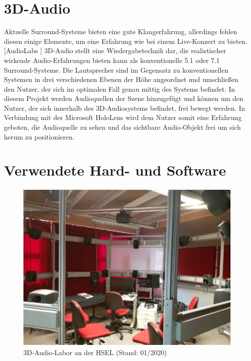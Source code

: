 \documentclass[11pt, titlepage, fleqn]{report}
\begin{document}
        \section{3D-Audio}
            Aktuelle Surround-Systeme bieten eine gute Klangerfahrung, 
            allerdings fehlen diesen einige Elemente, um eine Erfahrung wie bei 
            einem Live-Konzert zu bieten.  [AudioLabs \cite{AudioLabs}]\newline
            3D-Audio stellt eine Wiedergabetechnik dar, die realistischer wirkende Audio-Erfahrungen bieten kann als konventionelle 5.1 oder 7.1 Surround-Systeme.
            Die Lautsprecher sind im Gegensatz zu konventionellen Systemen in 
            drei verschiedenen Ebenen der Höhe angeordnet und umschließen den 
            Nutzer, der sich im optimalen Fall genau mittig des Systems 
            befindet.
            In diesem Projekt werden Audioquellen der Szene hinzugefügt und können um den Nutzer, der sich innerhalb des 3D-Audiosystems befindet, frei bewegt werden. In Verbindung mit der Microsoft 
            HoloLens wird dem Nutzer somit eine Erfahrung geboten, die Audioquelle zu sehen und das sichtbare Audio-Objekt frei um sich herum zu positionieren.       
        \label{sec:2.2}
   
        \section{Verwendete Hard- und Software}
        \label{sec:2.3}
        	\begin{figure}[H]
        		\centering
        		\includegraphics[height=8.5cm]{./img/Studio.png}
        		\caption[3D-Audio-Labor an der HSEL]{3D-Audio-Labor an der HSEL (Stand: 
        		01/2020)\label{fig:MR}}
        	\end{figure}
\end{document}
